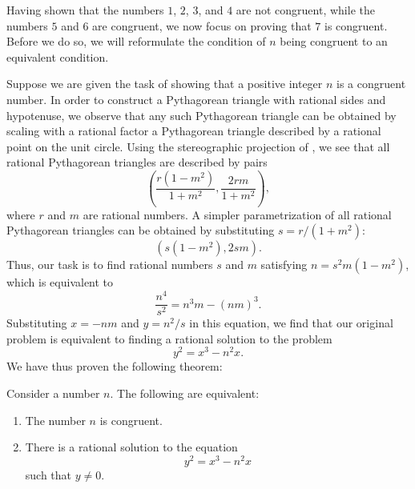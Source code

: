 Having shown that the numbers $1$, $2$, $3$, and $4$ are not congruent, while the numbers $5$ and $6$ are congruent, we now focus on proving that $7$ is congruent. Before we do so, we will reformulate the condition of $n$ being congruent to an equivalent condition.

Suppose we are given the task of showing that a positive integer $n$ is a congruent number. In order to construct a Pythagorean triangle with rational sides and hypotenuse, we observe that any such Pythagorean triangle can be obtained by scaling with a rational factor a Pythagorean triangle described by a rational point on the unit circle. Using the stereographic projection of , we see that all rational Pythagorean triangles are described by pairs
\begin{equation*}
  \left(\frac{r(1-m^2)}{1+m^2},\frac{2rm}{1+m^2}\right),
\end{equation*}
where $r$ and $m$ are rational numbers. A simpler parametrization of all rational Pythagorean triangles can be obtained by substituting $s=r/(1+m^2)$:
\begin{equation*}
  (s(1-m^2),2sm).
\end{equation*}
Thus, our task is to find rational numbers $s$ and $m$ satisfying $n=s^2m(1-m^2)$, which is equivalent to
\begin{equation*}
  \frac{n^4}{s^2}=n^3m-(nm)^3.
\end{equation*}
Substituting $x=-nm$ and $y=n^2/s$ in this equation, we find that our original problem is equivalent to finding a rational solution to the problem
\begin{equation*}
  y^2=x^3-n^2x.
\end{equation*}
We have thus proven the following theorem:

\begin{theorem}
  Consider a number $n$. The following are equivalent:
  \begin{enumerate}
  \item The number $n$ is congruent.
  \item There is a rational solution to the equation
    \begin{equation*}
      y^2=x^3-n^2x
    \end{equation*}
    such that $y\neq 0$.
  \end{enumerate}
\end{theorem}

